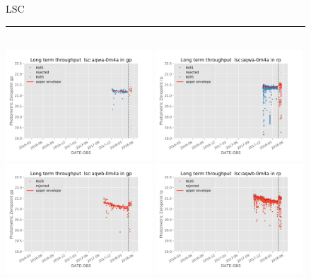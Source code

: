\documentclass[]{spieman}
\begin{document}
\begin{figure}
\centering 
LSC \\ 
\rule{\textwidth}{0.4pt} \\
\includegraphics[width=0.49\textwidth]{images/photzptrend-lsc-aqwa-0m4a-gp.png} \hspace*{\fill}
\includegraphics[width=0.49\textwidth]{images/photzptrend-lsc-aqwa-0m4a-rp.png} \\
\includegraphics[width=0.49\textwidth]{images/photzptrend-lsc-aqwb-0m4a-gp.png} \hspace*{\fill}
\includegraphics[width=0.49\textwidth]{images/photzptrend-lsc-aqwb-0m4a-rp.png} \\

\end{figure}
\end{document}
